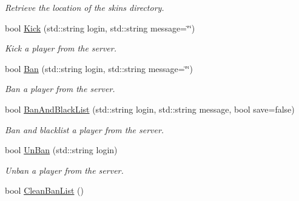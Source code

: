 \begin{DoxyCompactItemize}
\begin{DoxyCompactList}\small\item\em Retrieve the location of the skins directory. \end{DoxyCompactList}\item 
bool \hyperlink{classMethods_a5800041dd330d6445f4e6eee54af3d1f}{Kick} (std\-::string login, std\-::string message=\char`\"{}\char`\"{})
\begin{DoxyCompactList}\small\item\em Kick a player from the server. \end{DoxyCompactList}\item 
bool \hyperlink{classMethods_a0208506814a9baa623a21010f78a1883}{Ban} (std\-::string login, std\-::string message=\char`\"{}\char`\"{})
\begin{DoxyCompactList}\small\item\em Ban a player from the server. \end{DoxyCompactList}\item 
bool \hyperlink{classMethods_abe95a1c58dfd4d2d51f7e02eb4b924f0}{Ban\-And\-Black\-List} (std\-::string login, std\-::string message, bool save=false)
\begin{DoxyCompactList}\small\item\em Ban and blacklist a player from the server. \end{DoxyCompactList}\item 
bool \hyperlink{classMethods_a2458e854e2c5c36bf394d64bd97b13d1}{Un\-Ban} (std\-::string login)
\begin{DoxyCompactList}\small\item\em Unban a player from the server. \end{DoxyCompactList}\item 
\hypertarget{classMethods_a261546083d5e43f8424cd16ee23c545e}{bool \hyperlink{classMethods_a261546083d5e43f8424cd16ee23c545e}{Clean\-Ban\-List} ()}\label{classMethods_a261546083d5e43f8424cd16ee23c545e}


\end{DoxyCompactItemize}
